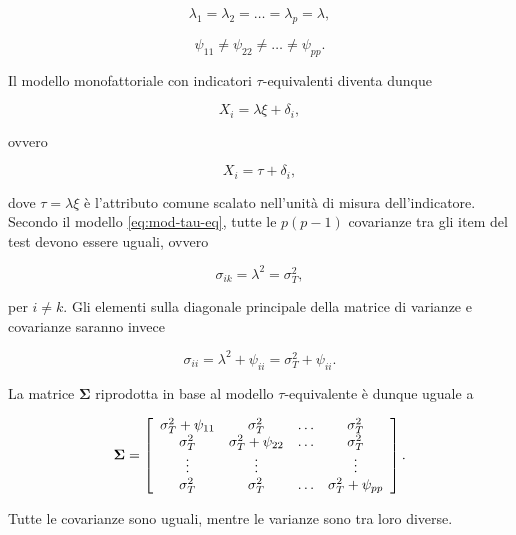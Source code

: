 \documentclass[
  11pt,
]{krantz}
\theoremstyle{definition}
\theoremstyle{definition}
\theoremstyle{definition}
\theoremstyle{definition}
\theoremstyle{remark}
\begin{document}
\[
\lambda_1=\lambda_2=\dots=\lambda_p=\lambda,
\]

\[
\psi_{11}\neq \psi_{22} \neq \dots\neq \psi_{pp}.
\]

Il modello monofattoriale con indicatori \(\tau\)-equivalenti diventa dunque

\begin{equation}
X_i = \lambda \xi + \delta_i, 
\label{eq:mod-tau-eq}
\end{equation}

ovvero

\begin{equation}
X_i = \tau + \delta_i,
\label{eq:mod-tau-eq-b}
\end{equation}

dove \(\tau=\lambda \xi\) è l'attributo comune scalato nell'unità di misura dell'indicatore. Secondo il modello \eqref{eq:mod-tau-eq}, tutte le \(p(p-1)\) covarianze tra gli item del test devono essere uguali, ovvero

\begin{equation}
\sigma_{ik} = \lambda^2=\sigma^2_T,
\label{eq:cov-tau-eq}
\end{equation}

per \(i\neq k\). Gli elementi sulla diagonale principale della matrice di varianze e covarianze saranno invece

\begin{equation}
\sigma_{ii} = \lambda^2 + \psi_{ii} =\sigma^2_T + \psi_{ii}.
\label{eq:var-tau}
\end{equation}

La matrice \(\boldsymbol{\Sigma}\) riprodotta in base al modello \(\tau\)-equivalente è dunque uguale a

\begin{equation}
\boldsymbol{\Sigma}=\left[
      \begin{array}{ c c c c }
        \sigma_{T}^2 + \psi_{11} & \sigma_{T}^2 & \dots & \sigma_{T}^2 \\
        \sigma_{T}^2 & \sigma_{T}^2 + \psi_{22} & \dots & \sigma_{T}^2 \\
        \vdots & \vdots & & \vdots\\
        \sigma_{T}^2 & \sigma_{T}^2 & \dots & \sigma_{T}^2 + \psi_{pp} 
      \end{array} 
    \right].
\label{eq:sigma-tau-eq}
\end{equation}

Tutte le covarianze sono uguali, mentre le varianze sono tra loro diverse.
\end{document}

